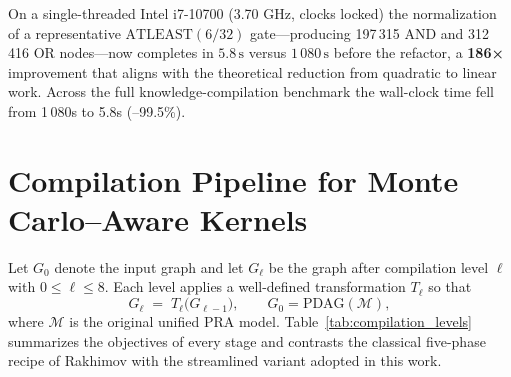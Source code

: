 On a single-threaded Intel i7-10700 (3.70 GHz, clocks locked) the
normalization of a representative
$\mathrm{ATLEAST}(6/32)$ gate—producing 197\,315 AND and
312\,416 OR nodes—now completes in
\(
  5.8\,\text{s}
\)
versus
\(
  1\,080\,\text{s}
\)
before the refactor, a {\bf 186×} improvement that aligns with the
theoretical reduction from quadratic to linear work.  Across the full
knowledge-compilation benchmark the wall-clock time fell from
1\,080s to 5.8s (–99.5\%).

\section{Compilation Pipeline for Monte Carlo--Aware Kernels}
\label{sec:kc_pipeline}

Let $G_0$ denote the input graph and let $G_{\ell}$ be the graph after compilation level $\ell$ with $0\le \ell\le8$.  Each level applies a well-defined transformation $T_{\ell}$ so that
\[
  G_{\ell} \;=\; T_{\ell}\bigl(G_{\ell-1}\bigr),
  \qquad G_{0}=\text{PDAG}(\mathcal{M}),
\]
where $\mathcal{M}$ is the original unified PRA model.  Table~\ref{tab:compilation_levels} summarizes the objectives of every stage and contrasts the classical five-phase recipe of Rakhimov with the streamlined variant adopted in this work.


